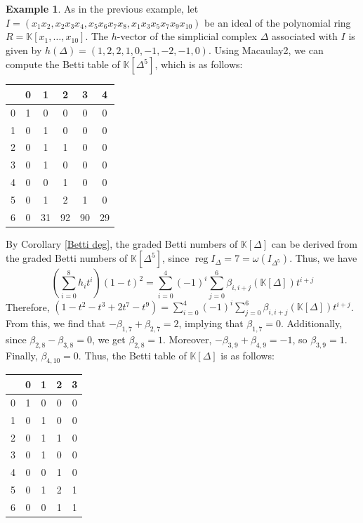 \documentclass[a4paper,12pt]{amsart}
\numberwithin{equation}{section}
\theoremstyle{definition}
\newtheorem{example}[theorem]{Example}
\newcommand{\K}[0]{\mathbb{K}}
\DeclareMathOperator{\reg}{reg}
\begin{document}
\begin{example}
	As in the previous example, let  $I=(x_1x_2,x_2x_3x_4,x_5x_6x_7x_8,x_1x_3x_5x_7x_9x_{10})$ be an ideal of the polynomial ring $R=\K[x_1,\dots,x_{10}]$. The $h$-vector of the simplicial complex $\Delta$ associated with $I$ is given by $h(\Delta)=(1,2,2,1,0,-1,-2,-1,0)$. Using Macaulay2, we can compute the Betti table of $\K[\Delta^5]$, which is as follows:
	\begin{center}
		\begin{tabular}{c|ccccc} 
			& 0 & 1 & 2 & 3 & 4\\
			\hline 0 & 1 & 0 & 0 & 0 & 0\\
			1 & 0 & 1 & 0 & 0 & 0\\
			2 & 0 & 1 & 1 & 0 & 0\\
			3 & 0 & 1& 0 & 0 & 0\\
			4 & 0 & 0 & 1 & 0 & 0\\
			5 & 0 & 1 & 2 & 1 & 0\\
			6 & 0 & 31 & 92 & 90 & 29
		\end{tabular}
	\end{center}
	By Corollary \ref{Betti deg}, the graded Betti numbers of $\K[\Delta]$ can be derived from the graded Betti numbers of $\K[\Delta^5]$, since $\reg I_{\Delta}=7=\omega(I_{\Delta^5})$. Thus, we have $$\left(\sum_{i=0}^{8}h_it^i\right)(1-t)^2=\sum_{i=0}^{4}(-1)^i\sum_{j=0}^{6}\beta_{i,i+j}(\K[\Delta])t^{i+j}$$
	Therefore, $(1-t^2-t^3+2t^7-t^9)=\sum_{i=0}^{4}(-1)^i\sum_{j=0}^{6}\beta_{i,i+j}(\K[\Delta])t^{i+j}$. From this, we find that $-\beta_{1,7}+\beta_{2,7}=2$, implying that  $\beta_{1,7}=0$. Additionally, since $\beta_{2,8}-\beta_{3,8}=0$, we get $\beta_{2,8}=1$. Moreover, $-\beta_{3,9}+\beta_{4,9}=-1$, so $\beta_{3,9}=1$. Finally, $\beta_{4,10}=0$. Thus, the Betti table of $\K[\Delta]$ is as follows:
	\begin{center}
		\begin{tabular}{c|cccc} 
			& 0 & 1 & 2 & 3 \\
			\hline 0 & 1 & 0 & 0 & 0 \\
			1 & 0 & 1 & 0 & 0 \\
			2 & 0 & 1 & 1 & 0 \\
			3 & 0 & 1& 0 & 0 \\
			4 & 0 & 0 & 1 & 0 \\
			5 & 0 & 1 & 2 & 1\\
			6 & 0 & 0 & 1 & 1
		\end{tabular}
	\end{center}
\end{example}
\end{document}
